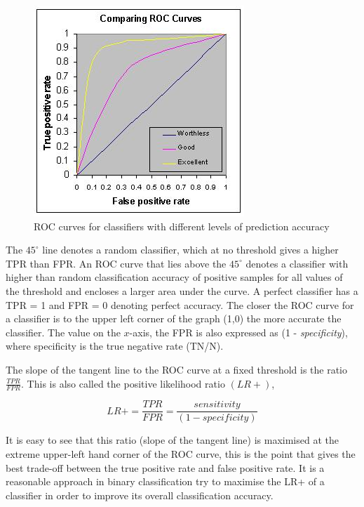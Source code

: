 \documentclass[final,3p,times,twocolumn]{elsarticle}
\begin{document}
\begin{figure}
\includegraphics[scale=3]{Images/Comparing_ROC.jpg}
\caption{ROC curves for classifiers with different levels of prediction accuracy}
\label{roc}
\end{figure}

The $45^\circ$ line denotes a random classifier, which at no threshold gives a higher TPR than FPR. An ROC curve that lies above the $45^\circ$ denotes a classifier with higher than random classification accuracy of positive samples for all values of the threshold and encloses a larger area under the curve. A perfect classifier has a TPR = 1 and FPR = 0 denoting perfect accuracy. The closer the ROC curve for a classifier is to the upper left corner of the graph (1,0) the more accurate the classifier. The value on the $x$-axis, the FPR is also expressed as (1 - \textit{specificity}), where  specificity is the true negative rate (TN/N).

The slope of the tangent line to the ROC curve at a fixed threshold is the ratio $\frac{\displaystyle TPR}{\displaystyle FPR}$. This is also called the positive likelihood ratio $(LR+)$, 

\begin{equation} 
LR+ = \frac{TPR}{FPR} = \frac{sensitivity}{(1 - specificity)} 
\end{equation}

It is easy to see that this ratio (slope of the tangent line) is maximised at the extreme upper-left hand corner of the ROC curve, this is the point that gives the best trade-off between  the true positive rate and false positive rate. It is a reasonable approach in binary classification try to maximise the LR+ of a classifier in order to improve its overall classification accuracy.
\end{document}
